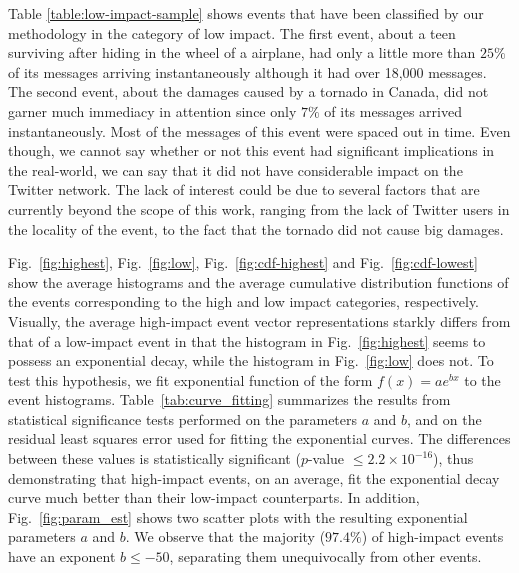 \documentclass[10pt,letterpaper]{article}
\begin{document}
Table \ref{table:low-impact-sample} shows events that have been
classified by our methodology in the category of low impact.  The
first event, about a teen surviving after hiding in the wheel of a
airplane, had only a little more than $25\%$ of its messages arriving
instantaneously although it had over 18,000 messages.  The second
event, about the damages caused by a tornado in Canada, did not garner
much immediacy in attention since only $7\%$ of its messages arrived
instantaneously. Most of the messages of this event were spaced out in
time. Even though, we cannot say whether or not this event had
significant implications in the real-world, we can say that it did not
have considerable impact on the Twitter network. The lack of interest
could be due to several factors that are currently beyond the scope of
this work, ranging from the lack of Twitter users in the locality of
the event, to the fact that the tornado did not cause big damages.

Fig.~\ref{fig:highest}, Fig.~\ref{fig:low}, Fig.~\ref{fig:cdf-highest} and
Fig.~\ref{fig:cdf-lowest} show the average histograms and the average
cumulative distribution functions of the events corresponding to the
high and low impact categories, respectively.  Visually, the average
high-impact event vector representations starkly differs from that of
a low-impact event in that the histogram in Fig.~\ref{fig:highest}
seems to possess an exponential decay, while the histogram in
Fig.~\ref{fig:low} does not.  To test this hypothesis, we fit
exponential function of the form $f(x)=ae^{bx}$ to the event
histograms. Table~\ref{tab:curve_fitting} summarizes the results from
statistical significance tests performed on the parameters $a$ and
$b$, and on the residual least squares error used for fitting the
exponential curves.  The differences between these values is
statistically significant ($p$-value $\leq2.2\times 10^{-16}$), thus demonstrating
that high-impact events, on an average, fit the exponential decay
curve much better than their low-impact counterparts.  In addition,
Fig.~\ref{fig:param_est} shows two scatter plots with the resulting
exponential parameters $a$ and $b$.  We observe that the majority
($97.4\%$) of high-impact events have an exponent $b \leq -50$,
separating them unequivocally from other events.
\end{document}
